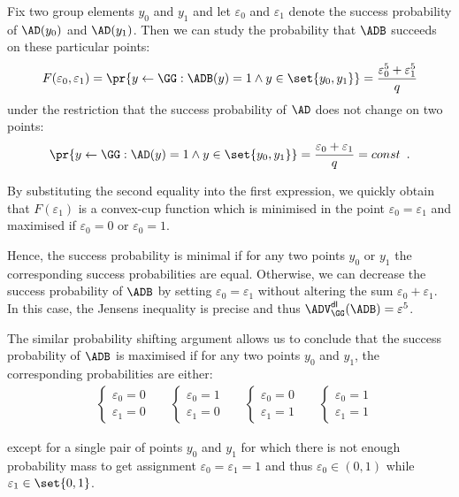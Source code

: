 \documentclass{crypto-exercise}
\begin{document}
\begin{solution}
Fix two group elements $y_0$ and $y_1$ and let $\varepsilon_0$ and $\varepsilon_1$ denote the success probability of $\AD(y_0)$ and $\AD(y_1)$. Then we can study the probability that $\ADB$ succeeds on these particular points:
\begin{align*}
F(\varepsilon_0,\varepsilon_1)=\pr{y\gets\GG: \ADB(y)=1\wedge y\in\set{y_0,y_1}}=\frac{\varepsilon_0^5+ \varepsilon_1^5}{q}
\end{align*} 
under the restriction that the success probability of $\AD$ does not change on two points:
\begin{align*}
\pr{y\gets\GG: \AD(y)=1\wedge y\in\set{y_0,y_1}}=\frac{\varepsilon_0+ \varepsilon_1}{q}=const\enspace.
\end{align*}
 
By substituting the second equality into the first expression, we quickly obtain that $F(\varepsilon_1)$ is a convex-cup function which is minimised in the point $\varepsilon_0=\varepsilon_1$ and maximised if $\varepsilon_0=0$ or $\varepsilon_0=1$.

Hence, the success probability is minimal if for any two points $y_0$ or $y_1$ the corresponding success probabilities are equal. Otherwise, we can decrease the success probability of $\ADB$ by setting $\varepsilon_0=\varepsilon_1$ without altering the sum $\varepsilon_0+\varepsilon_1$. In this case, the Jensens inequality is precise and thus $\ADVDL{\GG}{\ADB}=\varepsilon^5$.


The similar probability shifting argument allows us to conclude that the success probability of $\ADB$ is maximised if for any two points $y_0$ and $y_1$, the corresponding probabilities are either:
\begin{align*}
&\begin{cases}
\varepsilon_0=0\\
\varepsilon_1=0
\end{cases}
&&\begin{cases}
\varepsilon_0=1\\
\varepsilon_1=0
\end{cases}
&&\begin{cases}
\varepsilon_0=0\\
\varepsilon_1=1
\end{cases}
&&\begin{cases}
\varepsilon_0=1\\
\varepsilon_1=1
\end{cases}
\end{align*}
\end{solution}
except for a single pair of points $y_0$ and $y_1$ for which there is not enough probability mass to get assignment $\varepsilon_0=\varepsilon_1=1$ and thus $\varepsilon_0\in(0,1)$ while $\varepsilon_1\in\set{0,1}$.
\end{document}
